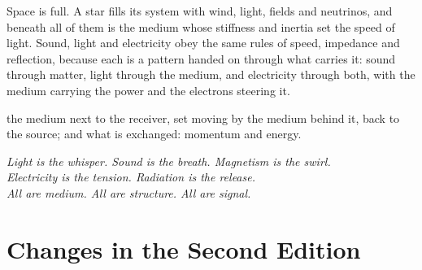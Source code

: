 \documentclass[11pt,a4paper]{article}
\begin{document}
Space is full. A star fills its system with wind, light, fields and neutrinos, and beneath all of them is the medium whose stiffness and inertia set the speed of light. Sound, light and electricity obey the same rules of speed, impedance and reflection, because each is a pattern handed on through what carries it: sound through matter, light through the medium, and electricity through both, with the medium carrying the power and the electrons steering it.

 the medium next to the receiver, set moving by the medium behind it, back to the source; and what is exchanged: momentum and energy.

\par\noindent\begin{minipage}{\linewidth}\begin{center}\itshape
Light is the whisper. Sound is the breath. Magnetism is the swirl.\\
Electricity is the tension. Radiation is the release.\\
All are medium. All are structure. All are signal.
\end{center}\end{minipage}

\clearpage
\section*{Changes in the Second Edition}
\small
\end{document}
